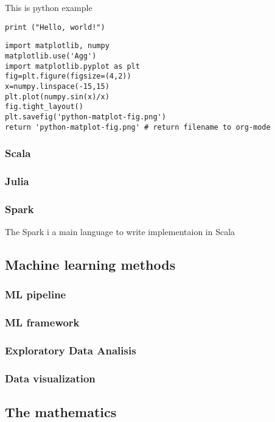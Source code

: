 \documentclass[11pt]{article}
\begin{document}
This is python example 

\begin{verbatim}
print ("Hello, world!")
\end{verbatim}


\begin{verbatim}
import matplotlib, numpy
matplotlib.use('Agg')
import matplotlib.pyplot as plt
fig=plt.figure(figsize=(4,2))
x=numpy.linspace(-15,15)
plt.plot(numpy.sin(x)/x)
fig.tight_layout()
plt.savefig('python-matplot-fig.png')
return 'python-matplot-fig.png' # return filename to org-mode
\end{verbatim}

\subsubsection{Scala}
\label{sec:orgd4e8f07}
\subsubsection{Julia}
\label{sec:org5d5bbed}
\subsubsection{Spark}
\label{sec:org769eacb}
The Spark i a main language to write implementaion in Scala

\subsection{Machine learning methods}
\label{sec:org1b99ea6}
\subsubsection{ML pipeline}
\label{sec:org9e93b9f}
\subsubsection{ML framework}
\label{sec:org6b00fc7}
\subsubsection{Exploratory Data Analisis}
\label{sec:org12c8a63}
\subsubsection{Data visualization}
\label{sec:orgb9c3ae1}

\subsection{The mathematics}
\label{sec:orgc8a138b}
\end{document}
